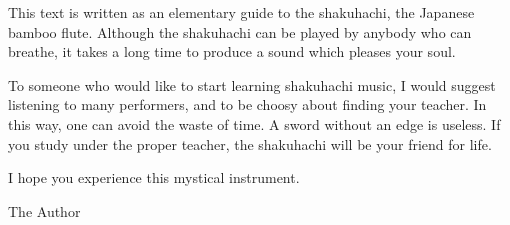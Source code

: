 ﻿This text is written as an elementary guide to the shakuhachi, the Japanese bamboo flute. Although the shakuhachi can be played by anybody who can breathe, it takes a long time to produce a sound which pleases your soul.

\par

To someone who would like to start learning shakuhachi music, I would suggest listening to many performers, and to be choosy about finding your teacher.  In this way, one can avoid the waste of time. A sword without an edge is useless. If you study under the proper teacher, the shakuhachi will be your friend for life. 

\par

I hope you experience this mystical instrument.
 
\par
                      
\hfill                                                        The Author

